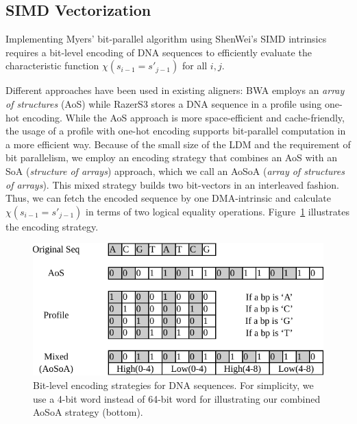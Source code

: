 \documentclass[conference]{IEEEtran}
\begin{document}


\subsection{SIMD Vectorization}
Implementing Myers' bit-parallel algorithm using ShenWei's SIMD intrinsics requires a bit-level encoding of DNA sequences to efficiently evaluate the characteristic function $\chi(s_{i-1} = s'_{j-1})$ for all $i, j$.

Different approaches have been used in existing aligners: BWA \cite{bwa} employs an {\em array of structures} (AoS) while RazerS3 \cite{razers3} stores a DNA sequence in a profile using one-hot encoding. While the AoS approach is more space-efficient and cache-friendly, the usage of a profile with one-hot encoding supports bit-parallel computation in a more efficient way.  Because of the small size of the LDM and the requirement of bit parallelism, we employ an encoding strategy that combines an AoS with an SoA ({\em structure of arrays}) approach, which we call an AoSoA ({\em array of structures of arrays}). This mixed strategy builds two bit-vectors in an interleaved fashion. Thus, we can fetch the encoded sequence by one DMA-intrinsic and calculate $\chi(s_{i-1} = s'_{j-1})$ in terms of two logical equality operations. Figure~\ref{MixPack}  illustrates the encoding strategy.

\begin{figure}[!htb]
	\includegraphics[width=0.9\linewidth]{MixPack}
	\caption{Bit-level encoding strategies for DNA sequences. For simplicity, we use a 4-bit word instead of 64-bit word for illustrating our combined AoSoA strategy (bottom).}
	\label{MixPack}
\end{figure}
\end{document}
